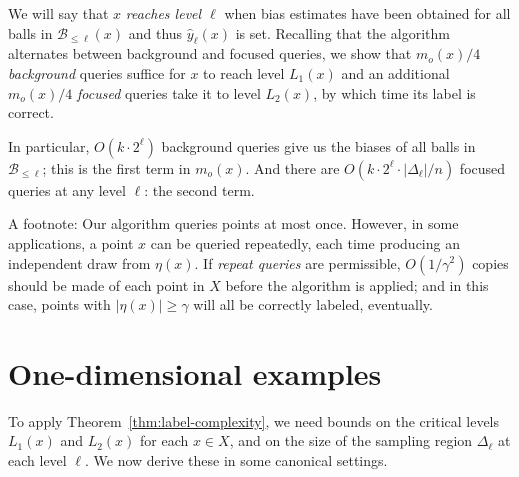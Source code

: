 \documentclass[twoside]{article}
\def\B{{\mathcal B}}
\def\yh{{\widehat{y}}}
\begin{document}
We will say that $x$ \emph{reaches level $\ell$} when bias estimates have been obtained for all balls in $\B_{\leq \ell}(x)$ and thus $\yh_\ell(x)$ is set. Recalling that the algorithm alternates between background and focused queries, we show that $m_o(x)/4$ \emph{background} queries suffice for $x$ to reach level $L_1(x)$ and an additional $m_o(x)/4$ \emph{focused} queries take it to level $L_2(x)$, by which time its label is correct.

In particular, $O(k \cdot 2^\ell)$ background queries give us the biases of all balls in $\B_{\leq \ell}$; this is the first term in $m_o(x)$. And there are $O(k \cdot 2^\ell \cdot |\Delta_\ell|/n)$ focused queries at any level $\ell$: the second term.

A footnote: Our algorithm queries points at most once. However, in some applications, a point $x$ can be queried repeatedly, each time producing an independent draw from $\eta(x)$. If \emph{repeat queries} are permissible, $O(1/\gamma^2)$ copies should be made of each point in $X$ before the algorithm is applied; and in this case, points with $|\eta(x)| \geq \gamma$ will all be correctly labeled, eventually.



\section{One-dimensional examples}

To apply Theorem~\ref{thm:label-complexity}, we need bounds on the critical levels $L_1(x)$ and $L_2(x)$ for each $x \in X$, and on the size of the sampling region $\Delta_\ell$ at each level $\ell$. We now derive these in some canonical settings.
\end{document}
